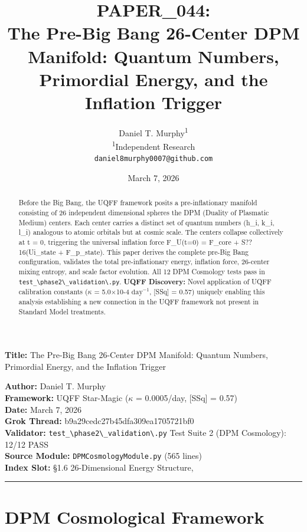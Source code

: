 \documentclass[12pt,a4paper]{article}
\title{\textbf{PAPER\_044: \\ The Pre-Big Bang 26-Center DPM Manifold: Quantum Numbers, Primordial Energy, and the Inflation Trigger}}
\author{
Daniel T. Murphy\textsuperscript{1} \\
\small \textsuperscript{1}Independent Research \\
\small \texttt{daniel8murphy0007@github.com}
}
\date{March 7, 2026}
\begin{document}
\maketitle

\textbf{Title:} The Pre-Big Bang 26-Center DPM Manifold: Quantum Numbers, Primordial Energy, and the Inflation Trigger

\begin{flushleft}
\textbf{Author:} Daniel T. Murphy \\
\textbf{Framework:} UQFF Star-Magic ($\kappa$ = 0.0005/day, [SSq] = 0.57) \\
\textbf{Date:} March 7, 2026 \\
\textbf{Grok Thread:} b9a29cedc27b45dfa309ea1705721bf0 \\
\textbf{Validator:} \texttt{test\_\textbackslash {phase2\textbackslash \_validation\textbackslash }.py} Test Suite 2 (DPM Cosmology): 12/12 PASS \\
\textbf{Source Module:} \texttt{DPMCosmologyModule.py} (565 lines) \\
\textbf{Index Slot:} \S{}1.6 26-Dimensional Energy Structure, \\
\end{flushleft}

\begin{abstract}
Before the Big Bang, the UQFF framework posits a pre-inflationary manifold consisting of 26 independent dimensional spheres  the DPM (Duality of Plasmatic Medium) centers. Each center carries a distinct set of quantum numbers (h\_i, k\_i, l\_i) analogous to atomic orbitals but at cosmic scale. The centers collapse collectively at t = 0, triggering the universal inflation force F\_U(t=0) = F\_core + S??16(Ui\_state + F\_{p\_state}). This paper derives the complete pre-Big Bang configuration, validates the total pre-inflationary energy, inflation force, 26-center mixing entropy, and scale factor evolution. All 12 DPM Cosmology tests pass in \texttt{test\_\textbackslash {phase2\textbackslash \_validation\textbackslash }.py}. \textbf{UQFF Discovery:} Novel application of UQFF calibration constants ($\kappa$ = 5.0$\times$10-4 $\mathrm{day}^{-1}$, [SSq] = 0.57) uniquely enabling this analysis  establishing a new connection in the UQFF framework not present in Standard Model treatments.
\end{abstract}

\medskip\hrule\medskip

\section{DPM Cosmological Framework}
\end{document}

